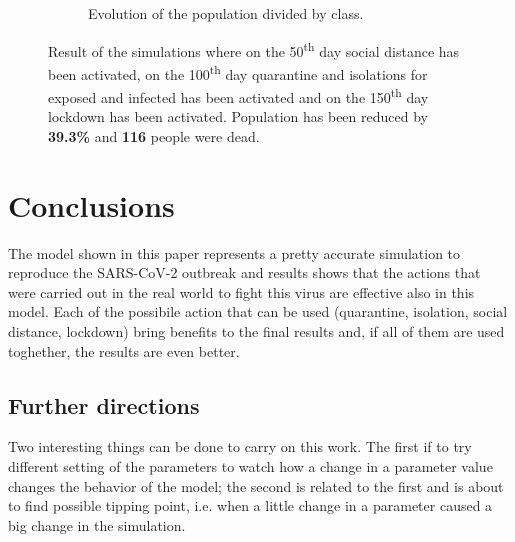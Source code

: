 \documentclass[12pt]{llncs}
\begin{document}
\begin{figure}
\begin{subfigure}{\textwidth}
{
    }
		\caption{Evolution of the population divided by class.} \label{fig:comb-a}
		\end{subfigure}
	\caption{Result of the simulations where on the 50\textsuperscript{th} day social distance has been activated, on the 100\textsuperscript{th} day quarantine and isolations for exposed and infected has been activated and on the 150\textsuperscript{th} day lockdown has been activated. Population has been reduced by \textbf{39.3\%} and \textbf{116} people were dead.}
	\label{fig:comb}
\end{figure}

\newpage
\section{Conclusions}
The model shown in this paper represents a pretty accurate simulation to reproduce the SARS-CoV-2 outbreak and results shows that the actions that were carried out in the real world to fight this virus are effective also in this model. Each of the possibile action that can be used (quarantine, isolation, social distance, lockdown) bring benefits to the final results and, if all of them are used toghether, the results are even better.

\subsection*{Further directions}
Two interesting things can be done to carry on this work. The first if to try different setting of the parameters to watch how a change in a parameter value changes the behavior of the model; the second is related to the first and is about to find possible tipping point, i.e. when a little change in a parameter caused a big change in the simulation.

\printbibliography[title={References}]
\end{document}
